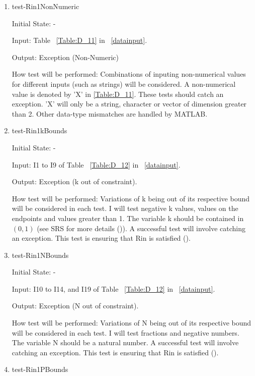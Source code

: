 \documentclass[12pt, titlepage]{article}
\begin{document}
\begin{enumerate}
\item{test-Rin1NonNumeric\\}	
				
Initial State: -
					
Input: Table ~\ref{Table:D_11} in ~\ref{datainput}.
					
Output: Exception (Non-Numeric) 
					
How test will be performed: Combinations of inputing non-numerical values for 
different 
inputs  (such as strings) will be considered. A non-numerical value is denoted 
by 'X' in \ref{Table:D_11}. These tests should catch an exception. 'X' will 
only be a string, character or vector of dimension greater than 2. Other 
data-type mismatches are handled by MATLAB.\\

\item{test-Rin1kBounds\\}	

Initial State: -

Input: I1 to I9 of Table ~\ref{Table:D_12} in ~\ref{datainput}.

Output: Exception (k out of constraint).

How test will be performed: Variations of k being out of its respective bound 
will be considered in each test. I will test negative k values, values on the 
endpoints and values greater than 1. The variable k should be contained in 
$(0,1)$ (see 
SRS for more details (\cite{SRS})). A successful test will involve catching 
an exception. This test is ensuring that Rin is satisfied (\cite{SRS}).\\ 

\item{test-Rin1NBounds\\}	

Initial State: -

Input: I10 to I14, and I19 of Table ~\ref{Table:D_12} in ~\ref{datainput}.

Output: Exception (N out of constraint).

How test will be performed: Variations of N being out of its respective bound 
will be considered in each test. I will test fractions and negative numbers. 
The variable N should be a natural number. A successful test will involve 
catching an exception. This test is ensuring that Rin is satisfied 
(\cite{SRS}). \\  

\item{test-Rin1PBounds\\}	


\end{enumerate}
\end{document}
